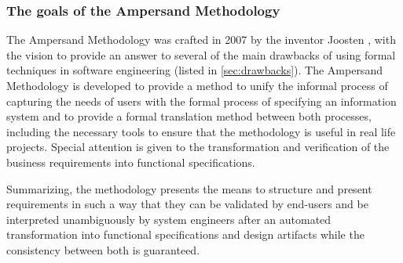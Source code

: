 \begin{description}
\end{description}


\subsubsection{The goals of the Ampersand Methodology}
   
The Ampersand Methodology was crafted in 2007 by the inventor Joosten , with the vision to provide an answer to several of the main drawbacks of using formal techniques  in software engineering (listed in \autoref{sec:drawbacks}). 
The Ampersand Methodology is  developed to provide a method to unify the informal process of capturing the needs of users with the formal process of specifying an information system and to provide a formal translation method between both processes, including the necessary tools to ensure that the methodology is useful in real life projects.
Special attention is given to the transformation and verification of the business requirements into functional specifications.

Summarizing, the methodology presents the means to structure and present requirements in such a way that they can be validated by end-users and be interpreted unambiguously by system engineers after an automated transformation into functional specifications and design artifacts while the consistency between both is guaranteed.

